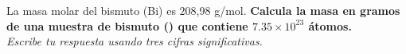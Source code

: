La masa molar del bismuto (Bi) es 208,98 g/mol.
\textbf{Calcula la masa en gramos de una muestra de bismuto () que contiene $7.35 \times 10^{23}$ átomos.}\\
\emph{Escribe tu respuesta usando tres cifras significativas.}